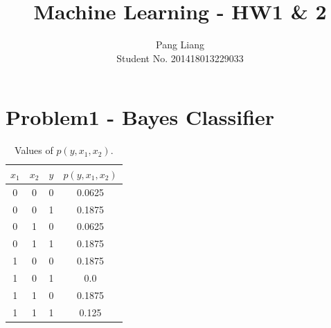 \documentclass[12pt]{article}
\title{Machine Learning - HW1 \& 2}
\author{Pang Liang\\ Student No. 201418013229033}
\begin{document}
\maketitle



\section{Problem1 - Bayes Classifier}

    \begin{table}[!hbp]
      \centering
      \begin{tabular}{|c|c|c||c|}
        \hline
        $x_1$ & $x_2$ & $y$ & $p(y, x_1, x_2)$ \\
        \hline
        0 & 0 & 0 & 0.0625 \\
        \hline
        0 & 0 & 1 & 0.1875 \\
        \hline
        0 & 1 & 0 & 0.0625 \\
        \hline
        0 & 1 & 1 & 0.1875 \\
        \hline
        1 & 0 & 0 & 0.1875 \\
        \hline
        1 & 0 & 1 & 0.0 \\
        \hline
        1 & 1 & 0 & 0.1875 \\
        \hline
        1 & 1 & 1 & 0.125 \\
        \hline
      \end{tabular}

      \caption{Values of $p(y , x_1, x_2)$.} \label{table1}
    \end{table}
\end{document}
